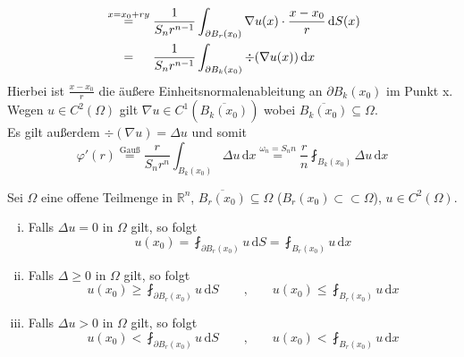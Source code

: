 \begin{beweis}
\begin{enumerate}[(i)]
\begin{align*}
			& \stackrel{x=x_0+ry}{=} \frac{1}{S_n r^{n-1}} \int_{\partial B_r(x_0)}^{}  \nabla u(x) \cdot \frac{x-x_0}{r} \,\mathrm{d}S(x) \\
			&\stackrel{\hphantom{x=x_0+ry}}{=} \frac{1}{S_n r^{n-1}} \int_{\partial B_k(x_0)}^{} \div (  \nabla u(x)) \,\mathrm{d}x
		\end{align*}
		Hierbei ist $\frac{x-x_0}{r}$ die äußere Einheitsnormalenableitung an $\partial B_k(x_0)$ im Punkt x. Wegen $u \in C^2(\Omega)$ gilt $ \nabla u \in C^1( \overline{B_k(x_0)})$ wobei $\overline{B_k(x_0)} \subseteq \Omega$. \\
		Es gilt außerdem $\div(  \nabla u) = \Delta u$ und somit
		\begin{equation}
			\varphi'(r) \stackrel{\text{Gauß}}{=} \frac{r}{S_n r^n} \int_{B_k(x_0)}^{} \Delta u \,\mathrm{d}x 
			\stackrel{\omega_n = S_n n}{=} \frac{r}{n} \fint_{B_k(x_0)}^{} \Delta u \,\mathrm{d}x
		\end{equation}
		\end{enumerate}
		
	\end{beweis}
\begin{korollar}[Mittelwerteigenschaft]
	Sei $\Omega$ eine offene Teilmenge in $\mathbb{R}^n$, $\overline{B_r(x_0)} \subseteq \Omega$ ($B_r(x_0) \subset \subset \Omega$), $u \in C^2(\Omega)$.
	\begin{enumerate}[(i)]
		\item Falls $ \Delta u = 0 $ in $\Omega$ gilt, so folgt
		\begin{equation}
			u(x_0) = \fint_{\partial B_r(x_0)}^{} u \,\mathrm{d}S = \fint_{B_r(x_0)}^{} u 	\,\mathrm{d}x
		\end{equation}
		\item Falls $\Delta \geq 0$ in $\Omega$ gilt, so folgt
		\begin{equation}
			u(x_0) \geq \fint_{\partial B_r(x_0)}^{} u \,\mathrm{d}S \qquad \text{,} \qquad u(x_0) \leq \fint_{B_r(x_0)}^{}u \,\mathrm{d}x
		\end{equation}
		\item Falls $\Delta u > 0$ in $\Omega$ gilt, so folgt
		\begin{equation}
			u(x_0) < \fint_{\partial B_r(x_0)}^{} u\,\mathrm{d}S \qquad \text{,} \qquad u(x_0) < \fint_{B_r(x_0)}^{} u \,\mathrm{d}x
		\end{equation}
	\end{enumerate}
	\end{korollar}

